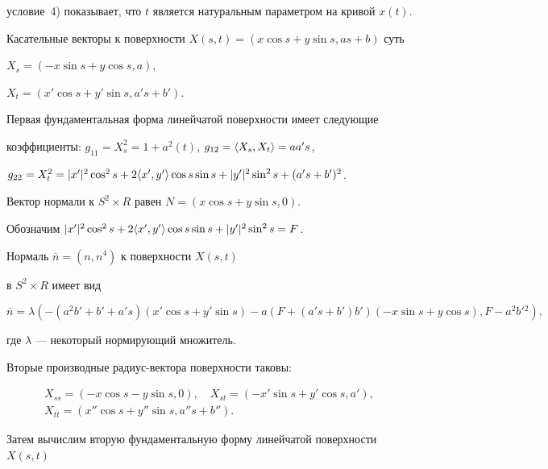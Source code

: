 \begin{pf}
условие~4) показывает, что $t$  является натуральным параметром на кривой $x(t)$.





Касательные векторы к поверхности $X(s,t)=(x \cos s+y \sin s,as+b)$ суть 


$X_s=(-x \sin s+y \cos s,a)$,


$X_t=(x' \cos s +y' \sin s, a's+b')$. 





Первая фундаментальная форма линейчатой поверхности имеет следующие 


коэффициенты: $g_{11}=X_s^2=1+a^2(t)$, $g_{12}=\langle X_s,X_t\rangle=aa's$, 


$g_{22}=X_t^2=|x'|^2 \cos ^2s+2\la x',y'\ra \cos s \sin s +|y'|^2


\sin ^2s +(a's+b')^2$.


 


Вектор нормали к $S^2 \times R$ равен $N=(x \cos s+ y \sin s,0)$. 


Обозначим $|x'|^2 \cos ^2s+2\langle x',y'\rangle \cos s \sin s +|y'|^2 \sin ^2s =F$. 


Нормаль $ \overline n =(n,n^4)$ к поверхности $X(s,t)$


в $S^2 \times R$ имеет вид  


$$


\overline n= \lambda (-(a^2b'+b'+a's)(x' \cos s+y' \sin s)-


a(F+(a's+b')b')(-x \sin s+ y \cos s), F-a^2b'{}^2 ),


$$


где $ \lambda$ --- некоторый нормирующий множитель.





Вторые производные радиус-вектора поверхности таковы:


\begin{gather*}


X_{ss}=(-x \cos s -y \sin s,0),\quad X_{st}=(-x' \sin s +y' \cos s, a'),\\


X_{tt}=(x'' \cos s+y'' \sin s, a''s+b'').


\end{gather*}





Затем вычислим вторую фундаментальную форму линейчатой поверхности $X(s,t)$



\end{pf}
